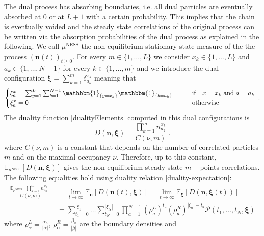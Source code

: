 \documentclass[10pt]{article}
\numberwithin{equation}{section}
\numberwithin{equation}{subsection}
\newcommand{\dt}{\;.}
\begin{document}
The dual process has absorbing boundaries, i.e. all dual particles are eventually absorbed at $0$ or at $L+1$ with a certain probability. This implies that the chain is eventually voided and the steady state correlations of the original process can be written via the absorption probabilities of the dual process as explained in the following. 
We call $\mu^{\text{NESS}}$ the non-equilibrium stationary state measure of the the process $(\bm{n}(t))_{t\geq 0}$. For every $m\in\{1,\ldots,L\}$ we consider  $x_{k}\in\{1,\ldots,L\}$ and $a_{k}\in \{1,\ldots,N-1\}$ for every $k\in \{1,\ldots,m\}$ and we introduce the dual configuration  $\bm{\xi}=\sum_{k=1}^{m}\delta_{a_{k}}^{x_{k}}$ meaning that 
\begin{equation}
	\begin{cases}
		\xi_{a}^{x}=\sum_{y=1}^{L}\sum_{b=1}^{N-1}\mathbbm{1}_{\{y=x_{k}\}}\mathbbm{1}_{\{b=a_{k}\}}\qquad &\text{if}\quad x=x_{k}\;\text{and} \; a=a_{k}\\
		\xi_{a}^{x}=0\qquad &\text{otherwise}
	\end{cases}\dt
\end{equation}
The duality function \eqref{dualityElements} computed in this dual configurations is 
\begin{equation}
	D(\bm{n},\bm{\xi})= \frac{\prod_{k=1}^{m}n_{a_{k}}^{x_{k}}}{C(\nu,m)}\dt
\end{equation}
where $C(\nu,m)$ is a constant that depends on the number of correlated particles $m$ and on the maximal occupancy $\nu$. 
Therefore, up to this constant, $\mathbb{E}_{\mu^{\text{NESS}}}\left[D(\bm{n},\bm{\xi})\right]$ gives the non-equilibrium steady state $m-$points correlations. The following equalities hold using duality relation \eqref{duality-expectation}:
\begin{equation}\label{ExptationSS}
	\begin{split}
		\frac{\mathbb{E}_{\mu^{\text{NESS}}}\left[\prod_{k=1}^{m}n_{a_{k}}^{x_{k}}\right]}{C(\nu,m)}&=\lim_{t\to\infty}\mathbb{E}_{\bm{n}}\left[D(\bm{n}(t),\bm{\xi})\right]=\lim_{t\to\infty}\mathbb{E}_{\bm{\xi}}\left[D(\bm{n},\bm{\xi}(t))\right]
		\\&=
		\sum_{t_{1}=0}^{|\xi_{1}|}\ldots\sum_{t_{N}=0}^{|\xi_{N}|}\prod_{a=1}^{N-1}\left(\rho_{a}^{L}\right)^{t_{a}}\left(\rho_{a}^{R}\right)^{|\xi_{a}|-t_{a}}\mathcal{P}(t_{1},\ldots,t_{N},\bm{\xi})
	\end{split}
\end{equation}
where  $\rho_{\alpha}^{L}=\frac{\alpha_{a}}{|\alpha|}$, $\rho_{\alpha}^{R}=\frac{\beta_{a}}{|\beta|}$ are the boundary densities and 
\end{document}
